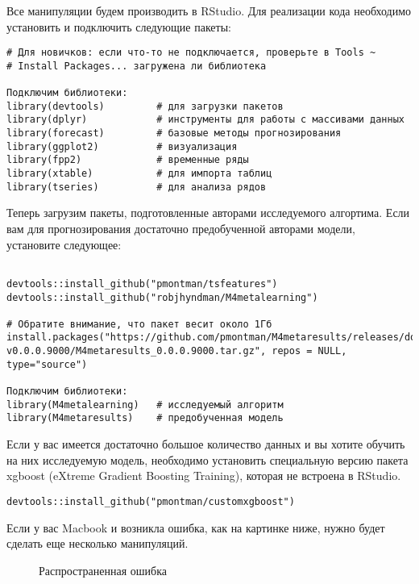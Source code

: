 \documentclass[a4paper,12pt]{article}
\theoremstyle{plain} %
\theoremstyle{definition} %
\theoremstyle{remark} %
\begin{document}
Все манипуляции будем производить в RStudio.
Для реализации кода необходимо установить и подключить следующие пакеты:

\begin{verbatim}
# Для новичков: если что-то не подключается, проверьте в Tools ~
# Install Packages... загружена ли библиотека

Подключим библиотеки:
library(devtools)         # для загрузки пакетов
library(dplyr)            # инструменты для работы с массивами данных
library(forecast)         # базовые методы прогнозирования
library(ggplot2)          # визуализация
library(fpp2)             # временные ряды
library(xtable)           # для импорта таблиц
library(tseries)          # для анализа рядов

\end{verbatim}

Теперь загрузим пакеты, подготовленные авторами исследуемого алгортима.
Если вам для прогнозирования достаточно предобученной авторами модели, установите следующее:

\begin{verbatim}

devtools::install_github("pmontman/tsfeatures")
devtools::install_github("robjhyndman/M4metalearning")

# Обратите внимание, что пакет весит около 1Гб
install.packages("https://github.com/pmontman/M4metaresults/releases/download/
v0.0.0.9000/M4metaresults_0.0.0.9000.tar.gz", repos = NULL, type="source")

Подключим библиотеки:
library(M4metalearning)   # исследуемый алгоритм
library(M4metaresults)    # предобученная модель
\end{verbatim}

Если у вас имеется достаточно большое количество данных и вы хотите обучить на них исследуемую модель, необходимо установить специальную версию пакета xgboost (eXtreme Gradient Boosting Training), которая не встроена в RStudio.

\begin{verbatim}
devtools::install_github("pmontman/customxgboost")
\end{verbatim}

Если у вас Macbook и возникла ошибка, как на картинке ниже, нужно будет сделать еще несколько манипуляций.

\begin{figure}[H]
  \noindent{}
  \caption{Распространенная ошибка}
\end{figure}
\end{document}
